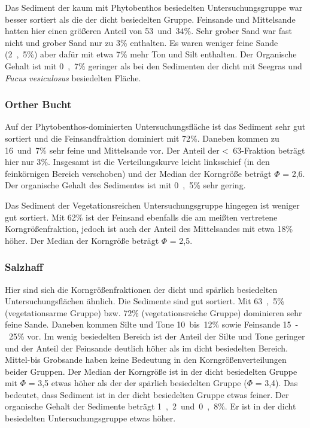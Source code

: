 Das Sediment der kaum mit Phytobenthos besiedelten Untersuchungsgruppe war besser sortiert als die der dicht besiedelten Gruppe. Feinsande und Mittelsande hatten hier einen größeren Anteil von \unit{53 und 34}{\%}. Sehr grober Sand war fast nicht und grober Sand nur zu \unit{3}{\%} enthalten. Es waren weniger feine Sande (\unit{2,5}{\%}) aber dafür mit etwa \unit{7}{\%} mehr Ton und Silt enthalten. Der Organische Gehalt ist mit \unit{0,7}{\%} geringer als bei den Sedimenten der dicht mit Seegras und \textit{Fucus vesiculosus} besiedelten Fläche.



\subsubsection{Orther Bucht}

Auf der Phytobenthos-dominierten Untersuchungsfläche ist das Sediment sehr gut sortiert und die Feinsandfraktion dominiert mit \unit{72}{\%}. Daneben kommen zu \unit{16 und 7}{\%} sehr feine und Mittelsande vor. Der Anteil der \unit{<63}{\mu\metre}-Fraktion beträgt hier nur \unit{3}{\%}. Insgesamt ist die Verteilungskurve leicht linksschief (in den feinkörnigen Bereich verschoben) und der Median der Korngröße beträgt $ \Phi $ = 2,6. Der organische Gehalt des Sedimentes ist mit \unit{0,5}{\%} sehr gering.

Das Sediment der Vegetationsreichen Untersuchungsgruppe hingegen ist weniger gut sortiert. Mit \unit{62}{\%} ist der Feinsand ebenfalls die am meißten vertretene Korngrößenfraktion, jedoch ist auch der Anteil des Mittelsandes mit etwa \unit{18}{\%} höher. Der Median der Korngröße beträgt $ \Phi $ = 2,5. 

\subsubsection{Salzhaff}

Hier sind sich die Korngrößenfraktionen der dicht und spärlich besiedelten Untersuchungsflächen ähnlich. Die Sedimente sind gut sortiert. Mit \unit{63,5}{\%}(vegetationsarme Gruppe) bzw. \unit{72}{\%} (vegetationsreiche Gruppe) dominieren sehr feine Sande. Daneben kommen Silte und Tone \unit{10 bis 12}{\%} sowie Feinsande \unit{15-25}{\%} vor. Im wenig besiedelten Bereich ist der Anteil der Silte und Tone geringer und der Anteil der Feinsande deutlich höher als im dicht besiedelten Bereich. Mittel-bis Grobsande haben keine Bedeutung in den  Korngrößenverteilungen beider Gruppen. Der Median der Korngröße ist in der dicht besiedelten Gruppe mit $ \Phi $ = 3,5 etwas höher als der der spärlich besiedelten Gruppe ($ \Phi $ = 3,4). Das bedeutet, dass Sediment ist in der dicht besiedelten Gruppe etwas feiner. Der organische Gehalt der Sedimente beträgt \unit{1,2 und 0,8}{\%}. Er ist in der dicht besiedelten Untersuchungsgruppe etwas höher. 


